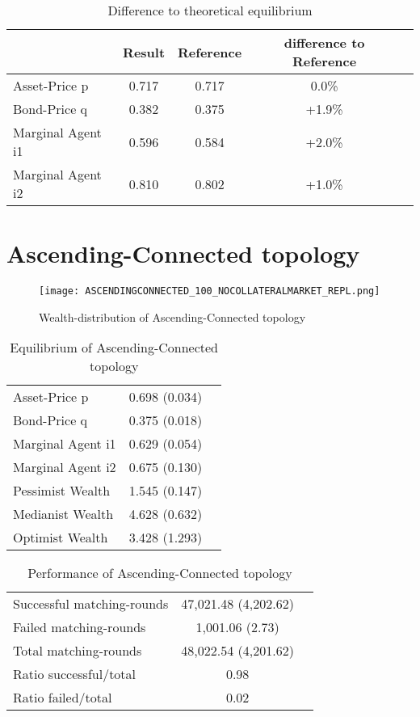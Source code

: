 \documentclass[Bachelorarbeit.tex]{subfiles}
\begin{document}
\begin{table}[H]
	\caption{Difference to theoretical equilibrium}
	\centering
	\begin{tabular} { l c c c r }
		& Result & Reference & difference to Reference \\
		\hline
		Asset-Price p & 0.717 & 0.717 & 0.0\% \\
		Bond-Price q & 0.382 & 0.375 & +1.9\% \\
		Marginal Agent i1 & 0.596  & 0.584 & +2.0\% \\
		Marginal Agent i2 & 0.810 & 0.802 & +1.0\% \\
		\hline
	\end{tabular}
\end{table}

\section{Ascending-Connected topology} 

\begin{figure}[H]
	\centering
  \texttt{[image: ASCENDINGCONNECTED\_100\_NOCOLLATERALMARKET\_REPL.png]}
	\caption{Wealth-distribution of Ascending-Connected topology}
	\label{fig:wealth_ASCENDINGCONNECTED_100_NOCOLLATERALMARKET_REPL}
\end{figure}

\begin{table}[H]
	\caption{Equilibrium of Ascending-Connected topology}
	\centering
	\begin{tabular} { l c r }
		\hline
		Asset-Price p & 0.698 (0.034) \\
		Bond-Price q & 0.375 (0.018) \\
		Marginal Agent i1 & 0.629 (0.054) \\
		Marginal Agent i2 & 0.675 (0.130) \\
		\hline
		Pessimist Wealth & 1.545 (0.147) \\
		Medianist Wealth & 4.628 (0.632) \\
		Optimist Wealth & 3.428 (1.293) \\
		\hline
	\end{tabular}
	\label{tab:ascendingconnected_equilibrium_100Agents_05Bond}
\end{table} 

\begin{table}[H]
	\caption{Performance of Ascending-Connected topology}
	\centering
	\begin{tabular} { l c r }
		\hline
		Successful matching-rounds & 47,021.48 (4,202.62) \\
		Failed matching-rounds & 1,001.06 (2.73) \\
		Total matching-rounds & 48,022.54 (4,201.62) \\
		\hline
		Ratio successful/total & 0.98 \\
		Ratio failed/total & 0.02 \\
		\hline
	\end{tabular}
\end{table}
\end{document}
